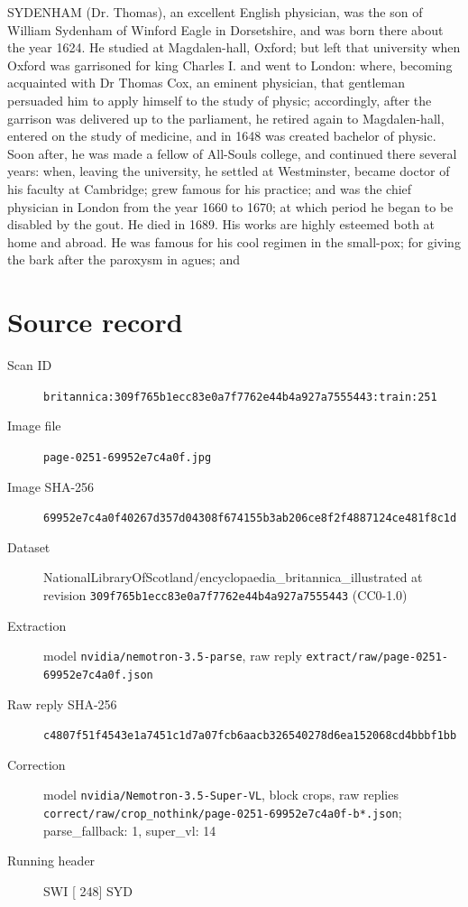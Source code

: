 \documentclass{article}
\begin{document}
SYDENHAM (Dr. Thomas), an excellent English physician, was the son of William Sydenham of Winford Eagle in Dorsetshire, and was born there about the year 1624. He studied at Magdalen-hall, Oxford; but left that university when Oxford was garrisoned for king Charles I. and went to London: where, becoming acquainted with Dr Thomas Cox, an eminent physician, that gentleman persuaded him to apply himself to the study of physic; accordingly, after the garrison was delivered up to the parliament, he retired again to Magdalen-hall, entered on the study of medicine, and in 1648 was created bachelor of physic. Soon after, he was made a fellow of All-Souls college, and continued there several years: when, leaving the university, he settled at Westminster, became doctor of his faculty at Cambridge; grew famous for his practice; and was the chief physician in London from the year 1660 to 1670; at which period he began to be disabled by the gout. He died in 1689. His works are highly esteemed both at home and abroad. He was famous for his cool regimen in the small-pox; for giving the bark after the paroxysm in agues; and


\section*{Source record}
\begin{description}
\item[Scan ID] \texttt{britannica:309f765b1ecc83e0a7f7762e44b4a927a7555443:train:251}
\item[Image file] \texttt{page-0251-69952e7c4a0f.jpg}
\item[Image SHA-256] \texttt{69952e7c4a0f40267d357d04308f674155b3ab206ce8f2f4887124ce481f8c1d}
\item[Dataset] NationalLibraryOfScotland/encyclopaedia\_britannica\_illustrated at revision \texttt{309f765b1ecc83e0a7f7762e44b4a927a7555443} (CC0-1.0)
\item[Extraction] model \texttt{nvidia/nemotron-3.5-parse}, raw reply \texttt{extract/raw/page-0251-69952e7c4a0f.json}
\item[Raw reply SHA-256] \texttt{c4807f51f4543e1a7451c1d7a07fcb6aacb326540278d6ea152068cd4bbbf1bb}
\item[Correction] model \texttt{nvidia/Nemotron-3.5-Super-VL}, block crops, raw replies \texttt{correct/raw/crop\_nothink/page-0251-69952e7c4a0f-b*.json}; parse\_fallback: 1, super\_vl: 14
\item[Running header] SWI [ 248] SYD
\end{description}
\end{document}
